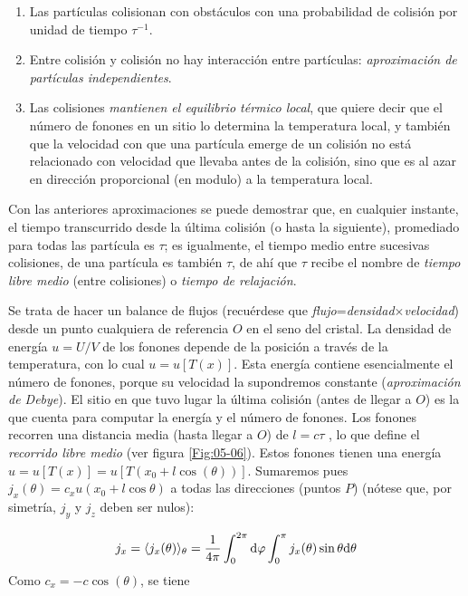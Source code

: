 \begin{enumerate}
\item Las partículas colisionan con obstáculos con una probabilidad de colisión por unidad de tiempo $\tau^{-1}$. 
\item Entre colisión y colisión no hay interacción entre partículas: \textit{aproximación de partículas independientes}.
\item Las colisiones \textit{mantienen el equilibrio térmico local}, que quiere decir que el número de fonones en un sitio lo determina la temperatura local, y también que la velocidad con que una partícula emerge de un colisión no está relacionado con velocidad que llevaba antes de la colisión, sino que es al azar en dirección proporcional (en modulo) a la temperatura local.
\end{enumerate}

Con las anteriores aproximaciones se puede demostrar que, en cualquier instante, el tiempo transcurrido desde la última colisión (o hasta la siguiente), promediado para todas las partícula es $\tau$; es igualmente, el tiempo medio entre sucesivas colisiones, de una partícula es también $\tau$, de ahí que $\tau$ recibe el nombre de \textit{tiempo libre medio} (entre colisiones) o \textit{tiempo de relajación}.  

Se trata de hacer un balance de flujos (recuérdese que \textit{flujo}=\textit{densidad}$\times$\textit{velocidad}) desde un punto cualquiera de referencia $O$ en el seno del cristal. La densidad de energía $u=U/V$ de los fonones depende de la posición a través de la temperatura, con lo cual $u=u[T(x)]$. Esta energía contiene esencialmente el número de fonones, porque su velocidad la supondremos constante (\textit{aproximación de Debye}). El sitio en que tuvo lugar la última colisión (antes de llegar a $O$) es la que cuenta para computar la energía y el número de fonones. Los fonones recorren una distancia media (hasta llegar a $O$) de $l=c \tau$ , lo que define el \textit{recorrido libre medio} (ver figura \ref{Fig:05-06}). Estos fonones tienen una energía $u=u[T(x)]=u[T(x_0+l\cos(\theta))]$. Sumaremos pues $j_x(\theta)=c_xu(x_0+l\cos \theta)$ a todas las direcciones (puntos $P$) (nótese que, por simetría, $j_y$ y $j_z$ deben ser nulos):

\begin{equation}
    j_x = \langle j_x(\theta) \rangle_{\theta} = \frac{1}{4\pi} \int_0^{2\pi} \mathrm{d} \varphi \int_0^\pi j_x (\theta) \sin \theta \mathrm{d} \theta 
\end{equation}
Como $c_x=-c\cos (\theta)$, se tiene


